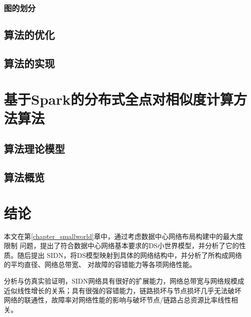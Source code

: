 \documentclass[master]{njuthesis}
\begin{document}
\subsection{图的划分}
\section{算法的优化}

\section{算法的实现}


\chapter{基于Spark的分布式全点对相似度计算方法算法}\label{chapter_allSimRank}
\section{算法理论模型}
\section{算法概览}











\chapter{结论}\label{chapter_concludes}

本文在第\ref{chapter_smallworld}章中，通过考虑数据中心网络布局构建中的最大度限制
问题，提出了符合数据中心网络基本要求的DS小世界模型，并分析了它的性质。随后提出
SIDN，将DS模型映射到具体的网络结构中，并分析了所构成网络的平均直径、网络总带宽、
对故障的容错能力等各项网络性能。

分析与仿真实验证明，SIDN网络具有很好的扩展能力，网络总带宽与网络规模成
近似线性增长的关系；具有很强的容错能力，链路损坏与节点损坏几乎无法破坏
网络的联通性，故障率对网络性能的影响与破坏节点/链路占总资源比率线性相关。
\end{document}
